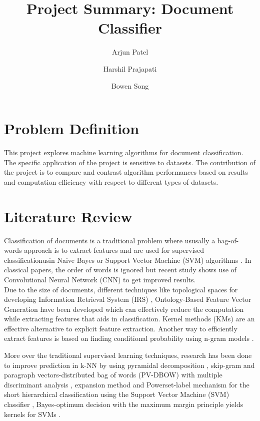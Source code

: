 \documentclass[a4paper, 11pt]{article}
\title{Project Summary: Document Classifier}
\author[1]{Arjun Patel}
\author[1]{Harshil Prajapati}
\author[1]{Bowen Song}
\affil[1]{Department of Electrical and Computer Engineering, Boston University}
\begin{document}
\maketitle
\section{Problem Definition}
This project explores machine learning algorithms for document classification. The specific application of the project is sensitive to datasets. The contribution of the project is to compare and contrast algorithm performances based on results and computation efficiency with respect to different types of datasets.
\section{Literature Review}
Classification of documents is a traditional problem where ususally a bag-of-words approach is to extract features and are used for supervised classificationusin Naive Bayes or Support Vector Machine (SVM) algorithms \cite{sachan2018investigating}. In classical papers, the order of words is ignored but recent study shows use of Convolutional Neural Network (CNN) \cite{kim2014convolutional} to get improved results.\\

Due to the size of documents, different techniques like topological spaces for developing Information Retrieval System (IRS) \cite{parlak2018feature},  Ontology-Based Feature Vector Generation \cite{elhadad2018novel} have been developed which can effectively reduce the computation while extracting features that aids in classification. Kernel methods (KMs) are an effective alternative to explicit feature extraction. Another way to efficiently extract features is based on finding conditional probability using n-gram models \cite{furnkranz1998study} .

More over the traditional supervised learning techniques, research has been done to improve prediction in k-NN by using pyramidal decomposition \cite{heroux1998classification},  skip-gram and paragraph vectors-distributed bag of words (PV-DBOW) with multiple discriminant analysis \cite{lauren2018discriminant}, expansion method and Powerset-label mechanism for the short hierarchical classification using the Support Vector Machine (SVM) classifier \cite{salih2018term}, Bayes-optimum decision with the maximum margin principle yields kernels for SVMs \cite{ding2014sensing}.
\end{document}
